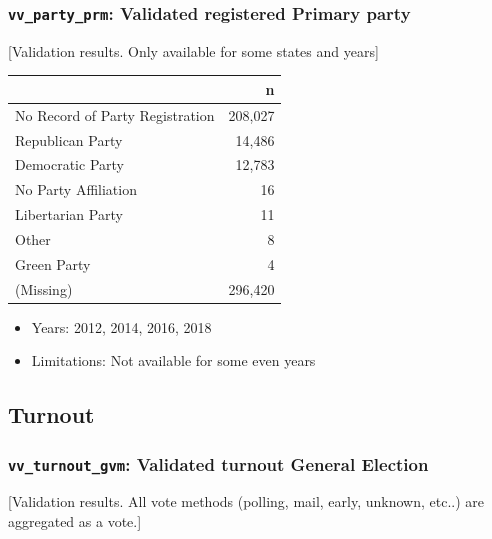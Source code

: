 \documentclass[10pt,article,oneside]{memoir}
\theoremstyle{definition}
\begin{document}
\hypertarget{vv_party_prm-validated-registered-primary-party}{%
\subsubsection{\texorpdfstring{\texttt{vv\_party\_prm}: Validated
registered Primary
party}{vv\_party\_prm: Validated registered Primary party}}\label{vv_party_prm-validated-registered-primary-party}}

{[}Validation results. Only available for some states and years{]}

\begin{table}[H]
\centering
\begin{tabular}{lr}
\toprule
 & n\\
\midrule
No Record of Party Registration & 208,027\\
Republican Party & 14,486\\
Democratic Party & 12,783\\
No Party Affiliation & 16\\
Libertarian Party & 11\\
Other & 8\\
Green Party & 4\\
(Missing) & 296,420\\
\bottomrule
\end{tabular}
\end{table}

\begin{itemize}
\tightlist
\item
  Years: 2012, 2014, 2016, 2018
\item
  Limitations: Not available for some even years
\end{itemize}

\hypertarget{turnout}{%
\subsection{Turnout}\label{turnout}}

\hypertarget{vv_turnout_gvm-validated-turnout-general-election}{%
\subsubsection{\texorpdfstring{\texttt{vv\_turnout\_gvm}: Validated
turnout General
Election}{vv\_turnout\_gvm: Validated turnout General Election}}\label{vv_turnout_gvm-validated-turnout-general-election}}

{[}Validation results. All vote methods (polling, mail, early, unknown,
etc..) are aggregated as a vote.{]}
\end{document}
